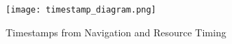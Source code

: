 








\begin{figure}[h!]
\begin{center}
\texttt{[image: timestamp\_diagram.png]}
\caption{Timestamps from Navigation and Resource Timing}
\label{img:latency}
\end{center}
\end{figure}




